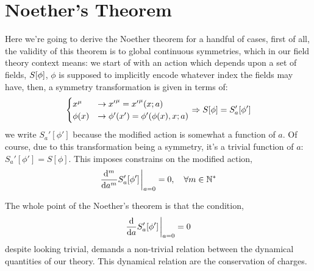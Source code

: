 \section{Noether's Theorem}
\label{appendix:noetherfirst}
Here we're going to derive the Noether theorem for a handful of cases, first of all, the validity 
of this theorem is to global continuous symmetries, which in our field theory context means: we start 
of with an action which depends upon a set of fields, $S\qty[\phi]$, $\phi$ is supposed to implicitly encode 
whatever index the fields may have, then, a symmetry transformation is given in terms of:
\begin{align}
    \begin{cases}
        x^\mu&\rightarrow {x'}^\mu = {x'}^\mu\qty(x;a)\\
        \phi\qty(x)&\rightarrow {\phi'}\qty(x')={\phi'}\qty(\phi\qty(x),x;a)
    \end{cases}\Rightarrow S\qty[\phi] = S_a'\qty[{\phi'}]
\end{align}
we write $S_a'[\phi']$ because the modified action is somewhat a function of $a$. Of course, due to this 
transformation being a symmetry, it's a trivial function of $a$: $S_a'[\phi'] =S[\phi]$. This imposes 
constrains on the modified action,
\begin{align}
    \dv[m]{}{a}S_a'[\phi']\eval_{a=0} = 0,\ \ \ \forall m\in\mathbb N^*
\end{align}

The whole point of the Noether's theorem is that the condition,
\begin{align}
    \dv{}{a}S_a'[\phi']\eval_{a=0} =0 
\end{align}
despite looking trivial, demands a non-trivial relation between the dynamical quantities of our theory. 
This dynamical relation are the conservation of charges.

